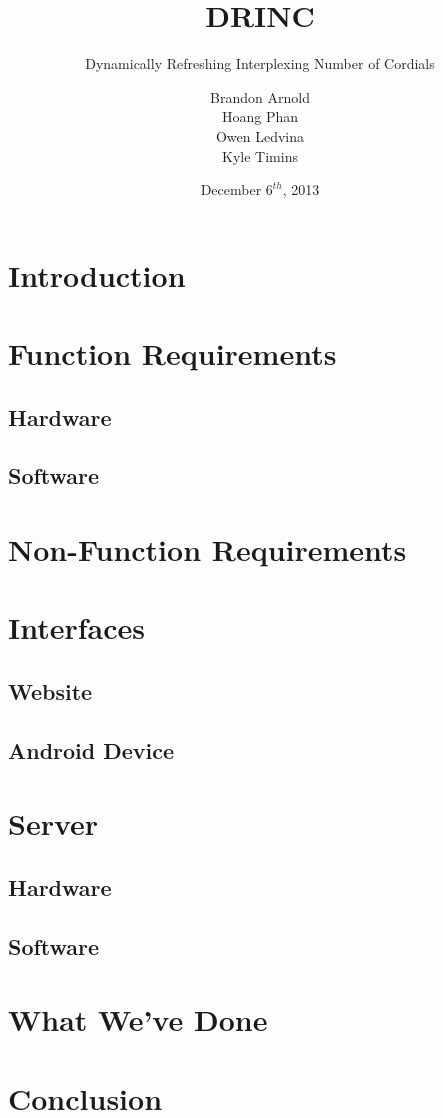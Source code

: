 \documentclass[compress]{beamer}
\title{DRINC}
\subtitle{Dynamically Refreshing Interplexing Number of Cordials}
\author[]{Brandon Arnold\\Hoang Phan\\Owen Ledvina\\Kyle Timins}
\date{December $6^{th}$, 2013}
\begin{document}
\frame{
    \titlepage
}

\section{Introduction}

\section{Function Requirements}

\subsection{Hardware}

\subsection{Software}

\section{Non-Function Requirements}

\section{Interfaces}

\subsection{Website}

\subsection{Android Device}

\section{Server}

\subsection{Hardware}

\subsection{Software}

\section{What We've Done}

\section{Conclusion}
\end{document}
